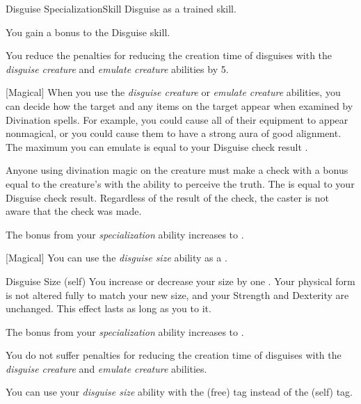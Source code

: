     \begin{feat}{Disguise Specialization}{Skill}
        \featpre Disguise as a trained skill.

         You gain a  bonus to the Disguise skill.

         You reduce the penalties for reducing the creation time of disguises with the \textit{disguise creature} and \textit{emulate creature} abilities by 5.

        [Magical] When you use the \textit{disguise creature} or \textit{emulate creature} abilities, you can decide how the target and any items on the target appear when examined by Divination spells.
        For example, you could cause all of their equipment to appear nonmagical, or you could cause them to have a strong aura of good alignment.
        The maximum  you can emulate is equal to your Disguise check result .

        Anyone using divination magic on the creature must make a check with a bonus equal to the creature's  with the ability to perceive the truth.
        The  is equal to your Disguise check result.
        Regardless of the result of the check, the caster is not aware that the check was made.

         The bonus from your \textit{specialization} ability increases to .

        [Magical] You can use the \textit{disguise size} ability as a .
        \begin{attuneability}{Disguise Size}
             (self)
            \rankline
            You increase or decrease your size by one .
            Your physical form is not altered fully to match your new size, and your Strength and Dexterity are unchanged.
            This effect lasts as long as you  to it.
        \end{attuneability}

         The bonus from your \textit{specialization} ability increases to .

         You do not suffer penalties for reducing the creation time of disguises with the \textit{disguise creature} and \textit{emulate creature} abilities.

         You can use your \textit{disguise size} ability with the  (free) tag instead of the  (self) tag.
    \end{feat}

